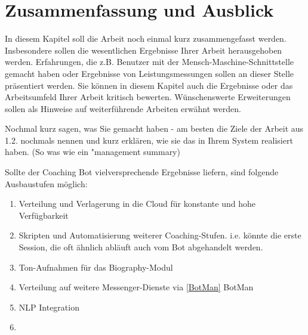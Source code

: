 \label{Zusammenfassung und Ausblick}
\chapter{Zusammenfassung und Ausblick}

In diesem Kapitel soll die Arbeit noch einmal kurz zusammengefasst werden. Insbesondere sollen die wesentlichen Ergebnisse Ihrer Arbeit herausgehoben werden. Erfahrungen, die z.B. Benutzer mit der Mensch-Maschine-Schnittstelle gemacht haben oder Ergebnisse von Leistungsmessungen sollen an dieser Stelle präsentiert werden. Sie können in diesem Kapitel auch die Ergebnisse oder das Arbeitsumfeld Ihrer Arbeit kritisch bewerten. Wünschenswerte Erweiterungen sollen als Hinweise auf weiterführende Arbeiten erwähnt werden.

Nochmal kurz sagen, was Sie gemacht haben - am besten die Ziele der Arbeit aus 1.2. nochmals nennen und kurz erklären, wie sie das in Ihrem System realisiert haben. (So was wie ein "management summary)  

Sollte der Coaching Bot vielversprechende Ergebnisse liefern, sind folgende Ausbaustufen möglich:

\begin{enumerate}
    \item Verteilung und Verlagerung in die Cloud für konstante und hohe Verfügbarkeit
    \item Skripten und Automatisierung weiterer Coaching-Stufen. i.e. könnte die erste Session, die oft ähnlich abläuft auch vom Bot abgehandelt werden.
    \item Ton-Aufnahmen für das Biography-Modul
    \item Verteilung auf weitere Messenger-Dienste via \ref{BotMan} BotMan
    \item NLP Integration
    \item 
\end{enumerate}
